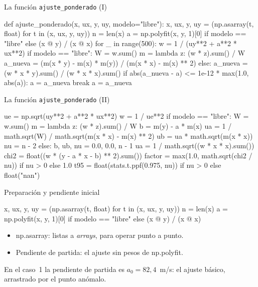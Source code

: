 \documentclass[10pt]{beamer}
\newcommand{\cod}[1]{{\setlength{\fboxsep}{1.4pt}\colorbox{codinline}{\textcolor{codrojo}{\ttfamily\small #1}}}}
\begin{document}
\begin{frame}[fragile]{La función \texttt{ajuste\_ponderado} (I)}
  \begin{codigo}[listing options={style=python, basicstyle=\ttfamily\scriptsize\color{codtexto}}]
def ajuste_ponderado(x, ux, y, uy, modelo="libre"):
    x, ux, y, uy = (np.asarray(t, float) for t in (x, ux, y, uy))
    n = len(x)
    a = np.polyfit(x, y, 1)[0] if modelo == "libre" else (x @ y) / (x @ x)
    for _ in range(500):
        w = 1 / (uy**2 + a**2 * ux**2)
        if modelo == "libre":
            W = w.sum()
            m = lambda z: (w * z).sum() / W
            a_nueva = (m(x * y) - m(x) * m(y)) / (m(x * x) - m(x) ** 2)
        else:
            a_nueva = (w * x * y).sum() / (w * x * x).sum()
        if abs(a_nueva - a) <= 1e-12 * max(1.0, abs(a)):
            a = a_nueva
            break
        a = a_nueva
  \end{codigo}
\end{frame}

\begin{frame}[fragile]{La función \texttt{ajuste\_ponderado} (II)}
  \begin{codigo}[listing options={style=python, basicstyle=\ttfamily\scriptsize\color{codtexto}}]
ue = np.sqrt(uy**2 + a**2 * ux**2)
w = 1 / ue**2
if modelo == "libre":
    W = w.sum()
    m = lambda z: (w * z).sum() / W
    b = m(y) - a * m(x)
    ua = 1 / math.sqrt(W) / math.sqrt(m(x * x) - m(x) ** 2)
    ub = ua * math.sqrt(m(x * x))
    nu = n - 2
else:
    b, ub, nu = 0.0, 0.0, n - 1
    ua = 1 / math.sqrt((w * x * x).sum())
chi2 = float((w * (y - a * x - b) ** 2).sum())
factor = max(1.0, math.sqrt(chi2 / nu)) if nu > 0 else 1.0
t95 = float(stats.t.ppf(0.975, nu)) if nu > 0 else float("nan")
  \end{codigo}
\end{frame}

\begin{frame}[fragile]{Preparación y pendiente inicial}
  \begin{codigo}[listing options={style=python, basicstyle=\ttfamily\scriptsize\color{codtexto}}]
x, ux, y, uy = (np.asarray(t, float) for t in (x, ux, y, uy))
n = len(x)
a = np.polyfit(x, y, 1)[0] if modelo == "libre" else (x @ y) / (x @ x)
  \end{codigo}
  \begin{itemize}
    \item \cod{np.asarray}: listas a \emph{arrays}, para operar punto a punto.
    \item Pendiente de partida: el ajuste sin pesos de \cod{np.polyfit}.
  \end{itemize}
  \begin{block}{}
    En el caso~1 la pendiente de partida es $a_{0}=82{,}4$~m/s: el ajuste básico,
    arrastrado por el punto anómalo.
  \end{block}
\end{frame}
\end{document}
